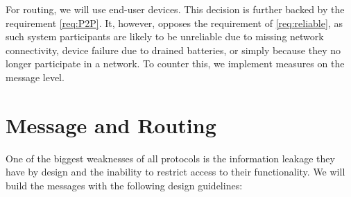 For routing, we will use end-user devices. This decision is further backed by the requirement \ref{req:P2P}. It, however, opposes the requirement of \ref{req:reliable}, as such system participants are likely to be unreliable due to missing network connectivity, device failure due to drained batteries, or simply because they no longer participate in a network. To counter this, we implement measures on the message level.


\section{Message and Routing}
One of the biggest weaknesses of all protocols is the information leakage they have by design and the inability to restrict access to their functionality. We will build the messages with the following design guidelines:
